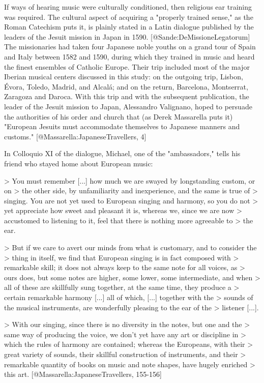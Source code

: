 If ways of hearing music were culturally conditioned, then religious ear
training was required. 
The cultural aspect of acquiring a "properly trained sense," as the Roman
Catechism puts it, is plainly stated in a Latin dialogue published by the
leaders of the Jesuit mission in Japan in 1590.
[@Sande:DeMissioneLegatorum]
The missionaries had taken four Japanese noble youths on a grand tour of Spain
and Italy between 1582 and 1590, during which they trained in music and heard
the finest ensembles of Catholic Europe.
Their trip included most of the major Iberian musical centers discussed in this
study: on the outgoing trip, Lisbon, Évora, Toledo, Madrid, and Alcalá; and on
the return, Barcelona, Montserrat, Zaragoza and Daroca. 
With this trip and with the subsequent publication, the leader of the Jesuit
mission to Japan, Alessandro Valignano, hoped to persuade the authorities of his
order and church that (as Derek Massarella puts it) "European Jesuits must
accommodate themselves to Japanese manners and customs."
[@Massarella:JapaneseTravellers, 4]

In Colloquio XI of the dialogue, Michael, one of the "ambassadors," tells his
friend who stayed home about European music:

> You must remember [...] how much we are swayed by longstanding custom, or on
> the other side, by unfamiliarity and inexperience, and the same is true of
> singing. You are not yet used to European singing and harmony, so you do not
> yet appreciate how sweet and pleasant it is, whereas we, since we are now
> accustomed to listening to it, feel that there is nothing more agreeable to
> the ear. 

> But if we care to avert our minds from what is customary, and to consider the
> thing in itself, we find that European singing is in fact composed with
> remarkable skill; it does not always keep to the same note for all voices, as
> ours does, but some notes are higher, some lower, some intermediate, and when
> all of these are skillfully sung together, at the same time, they produce a
> certain remarkable harmony [...] all of which, [...] together with the
> sounds of the musical instruments, are wonderfully pleasing to the ear of the
> listener [...]. 

> With our singing, since there is no diversity in the notes, but one and the
> same way of producing the voice, we don't yet have any art or discipline in
> which the rules of harmony are contained; whereas the Europeans, with their
> great variety of sounds, their skillful construction of instruments, and their
> remarkable quantity of books on music and note shapes, have hugely enriched
> this art. 
[@Massarella:JapaneseTravellers, 155-156]

